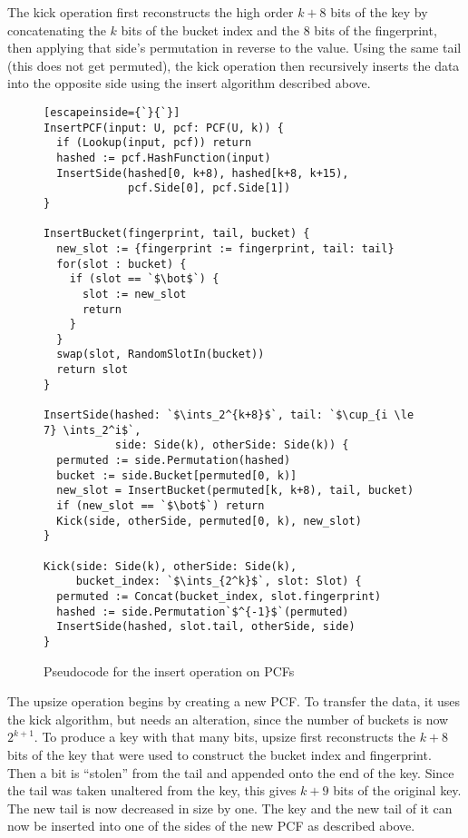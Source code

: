 \documentclass[letterpaper, 11pt]{article}
\newcommand{\ints}{\mathbb{Z}}
\begin{document}
The kick operation first reconstructs the high order $k + 8$ bits of the key by concatenating the $k$ bits of the bucket index and the $8$ bits of the fingerprint, then applying that side's permutation in reverse to the value.
Using the same tail (this does not get permuted), the kick operation then recursively inserts the data into the opposite side using the insert algorithm described above.

\begin{figure}
\begin{lstlisting}[escapeinside={`}{`}]
InsertPCF(input: U, pcf: PCF(U, k)) {
  if (Lookup(input, pcf)) return
  hashed := pcf.HashFunction(input)
  InsertSide(hashed[0, k+8), hashed[k+8, k+15),
             pcf.Side[0], pcf.Side[1])
}

InsertBucket(fingerprint, tail, bucket) {
  new_slot := {fingerprint := fingerprint, tail: tail}
  for(slot : bucket) {
    if (slot == `$\bot$`) {
      slot := new_slot
      return
    }
  }
  swap(slot, RandomSlotIn(bucket))
  return slot
}

InsertSide(hashed: `$\ints_2^{k+8}$`, tail: `$\cup_{i \le 7} \ints_2^i$`,
           side: Side(k), otherSide: Side(k)) {
  permuted := side.Permutation(hashed)
  bucket := side.Bucket[permuted[0, k)]
  new_slot = InsertBucket(permuted[k, k+8), tail, bucket)
  if (new_slot == `$\bot$`) return
  Kick(side, otherSide, permuted[0, k), new_slot)
}

Kick(side: Side(k), otherSide: Side(k),
     bucket_index: `$\ints_{2^k}$`, slot: Slot) {
  permuted := Concat(bucket_index, slot.fingerprint)
  hashed := side.Permutation`$^{-1}$`(permuted)
  InsertSide(hashed, slot.tail, otherSide, side)
}
\end{lstlisting}
\caption{Pseudocode for the insert operation on PCFs}
\end{figure}

The upsize operation begins by creating a new PCF.
To transfer the data, it uses the kick algorithm, but needs an alteration, since the number of buckets is now $2^{k+1}$.
To produce a key with that many bits, upsize first reconstructs the $k+8$ bits of the key that were used to construct the bucket index and fingerprint.
Then a bit is ``stolen'' from the tail and appended onto the end of the key.
Since the tail was taken unaltered from the key, this gives $k+9$ bits of the original key.
The new tail is now decreased in size by one.
The key and the new tail of it can now be inserted into one of the sides of the new PCF as described above.
\end{document}
